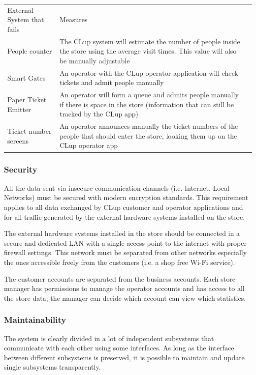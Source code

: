 \begin{tabular}{C{5cm}L{10.0cm}C{2.0cm}}
    External System that fails & Measures                                                                                                                                        \\
    People counter             & The CLup system will estimate the number of people inside the store using the average visit times. This value will also be manually adjustable  \\
    Smart Gates                & An operator with the CLup operator application will check tickets and admit people manually                                                     \\
    Paper Ticket Emitter       & An operator will form a queue and admits people manually if there is space in the store (information that can still be tracked by the CLup app) \\
    Ticket number screens      & An operator announces manually the ticket numbers of the people that should enter the store, looking them up on the CLup operator app           \\
\end{tabular}
\subsubsection{Security}
All the data sent via insecure communication channels (i.e. Internet, Local Networks) must be secured with modern encryption standards. This requirement applies to all data exchanged by CLup customer and operator applications and for all traffic generated by the external hardware systems installed on the store.

\smallskip

The external hardware systems installed in the store should be connected in a secure and dedicated LAN with a single access point to the internet with proper firewall settings. This network must be separated from other networks especially the ones accessible freely from the customers (i.e. a shop free Wi-Fi service).

\smallskip

The customer accounts are separated from the business accounts. Each store manager has permissions to manage the operator accounts and has access to all the store data; the manager can decide which account can view which statistics.
\subsubsection{Maintainability}
The system is clearly divided in a lot of independent subsystems that communicate with each other using some interfaces. As long as the interface between different subsystems is preserved, it is possible to maintain and update single subsystems transparently.
